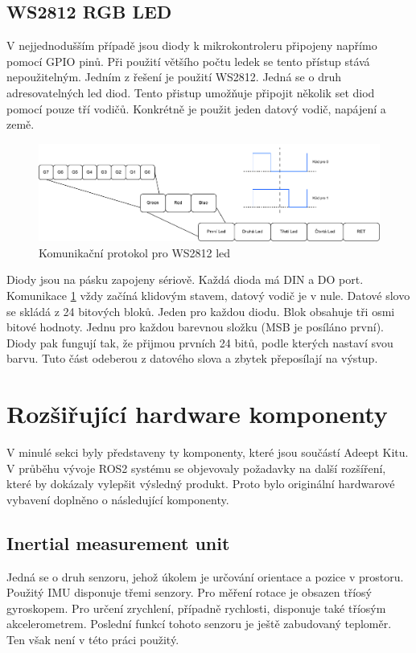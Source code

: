 \subsection*{WS2812 RGB LED}
V nejjednodušším případě jsou diody k mikrokontroleru připojeny napřímo pomocí GPIO pinů. Při použití většího počtu ledek se tento přístup stává nepoužitelným. Jedním z řešení je použití WS2812. Jedná se o druh adresovatelných led diod. Tento přistup umožňuje připojit několik set diod pomocí pouze tří vodičů. Konkrétně je použit jeden datový vodič, napájení a země.\cite[str:~2]{ws2812}

\begin{figure}[h!]
	\centering
	\includegraphics[scale=0.6]{obrazky-figures/ws2812_led.pdf}
	\caption{Komunikační protokol pro WS2812 led}
	\label{fig:ws2812_protocol}
\end{figure}

Diody jsou na pásku zapojeny sériově. Každá dioda má DIN a DO port. Komunikace \ref{fig:ws2812_protocol} vždy začíná klidovým stavem, datový vodič je v nule. Datové slovo se skládá z 24 bitových bloků. Jeden pro každou diodu. Blok obsahuje tři osmi bitové hodnoty. Jednu pro každou barevnou složku (MSB je posíláno první). Diody pak fungují tak, že přijmou prvních 24 bitů, podle kterých nastaví svou barvu. Tuto část odeberou z datového slova a zbytek přeposílají na výstup. \cite[str:~4]{ws2812}

\section{Rozšiřující hardware komponenty}
V minulé sekci byly představeny ty komponenty, které jsou součástí Adeept Kitu. V průběhu vývoje ROS2 systému se objevovaly požadavky na další rozšíření, které by dokázaly vylepšit výsledný produkt. Proto bylo originální hardwarové vybavení doplněno o následující komponenty.

\subsection*{Inertial measurement unit}
Jedná se o druh senzoru, jehož úkolem je určování orientace a pozice v prostoru. Použitý IMU disponuje třemi senzory. Pro měření rotace je obsazen tříosý gyroskopem. Pro určení zrychlení, případně rychlosti, disponuje také tříosým akcelerometrem. Poslední funkcí tohoto senzoru je ještě zabudovaný teploměr. Ten však není v této práci použitý.

